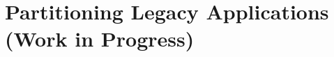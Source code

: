 \declarecommand{\sysname}{\civet{}}

\chapter{Partitioning Legacy \java{} Applications\\ (Work in Progress)}
\label{chap:civet}






%

